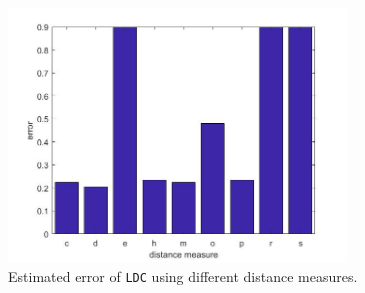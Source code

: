 \begin{figure}[H]
	\centering
	\includegraphics[width = 0.8\textwidth]{images/dissim_bar_dist.jpg}
	\caption{Estimated error of \texttt{LDC} using different distance measures.}
	\label{fig:dissim_bar_dist}
\end{figure}

